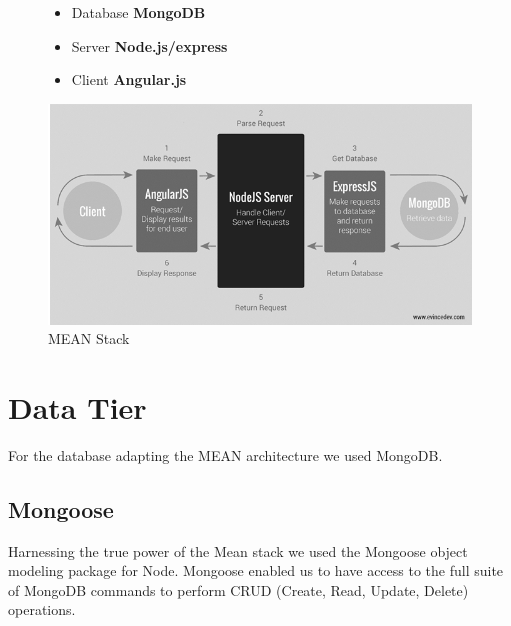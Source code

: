 \begin{figure}[H]
\begin{minipage}{.4\textwidth}  %
\lstset{linewidth = 4cm, breaklines=true} %
\begin{itemize}
\item Database \textbf{MongoDB}
\item Server \textbf{Node.js/express}
\item Client \textbf{Angular.js}
\end{itemize}

\end{minipage}
\qquad %
\begin{minipage}{0.6\textwidth} %
\includegraphics[scale=.4]{img/mvc.png} %
\caption{MEAN Stack}
\end{minipage}
\end{figure}

\section{Data Tier}
For the database adapting the MEAN architecture we used MongoDB.

\subsection{Mongoose}
Harnessing the true power of the Mean stack we used the Mongoose object modeling package for Node. Mongoose enabled us to have access to the full suite of MongoDB commands to perform CRUD (Create, Read, Update, Delete) operations. 


